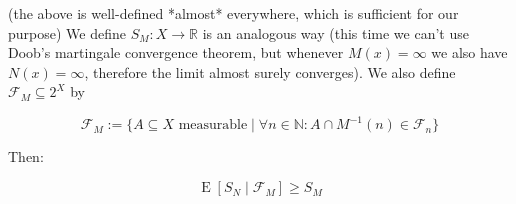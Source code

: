 \documentclass[a4paper]{article}
\DeclareMathOperator{\E}{E}
\newcommand{\Nats}{\mathbb{N}}
\newcommand{\Reals}{\mathbb{R}}
\newcommand{\F}{\mathcal{F}}
\begin{document}
(the above is well-defined *almost* everywhere, which is sufficient for our purpose) We define ${S_M: X \rightarrow \Reals}$ is an analogous way (this time we can't use Doob's martingale convergence theorem, but whenever ${M(x) = \infty}$ we also have ${N(x) = \infty}$, therefore the limit almost surely converges). We also define ${\F_M \subseteq 2^X}$ by

$$\F_M:=\{A \subseteq X \text{ measurable} \mid \forall n \in \Nats: A \cap M^{-1}(n) \in \F_n\}$$

Then:

$$\E[S_N \mid \F_M] \geq S_M$$
\end{document}
